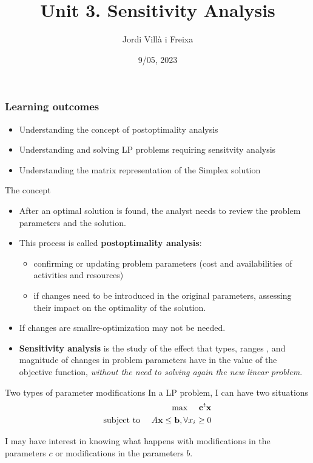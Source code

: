 \documentclass[c]{beamer}
\title[Introduction]{Unit 3. Sensitivity Analysis}
\author{Jordi Villà i Freixa}
\institute[FCTE]{
Universitat de Vic - Universitat Central de Catalunya \\
Study Abroad. Operations Research\\
\medskip
\textit{jordi.villa@uvic.cat}
}
\date{9/05, 2023}
\begin{document}
\begin{frame}
\titlepage
\end{frame}




\begin{frame}
\frametitle{Learning outcomes}
\begin{itemize}
  \item Understanding the concept of postoptimality analysis
  \item Understanding and solving LP problems requiring sensitvity analysis
  \item Understanding the matrix representation of the Simplex solution
\end{itemize}
\end{frame}

\begin{frame}{The concept}
\begin{itemize}
  \item After an optimal solution is found, the analyst needs to review the problem parameters and the solution.
  \item This process is called {\bf postoptimality analysis}:
  \begin{itemize}
    \item confirming or updating problem parameters (cost and availabilities of activities and resources)
    \item if changes need to be introduced in the original parameters, assessing their impact on the optimality of the solution.
  \end{itemize}
  \item If changes are smallre-optimization may not be needed.
  \item {\bf Sensitivity analysis} is the study of the effect that types, ranges , and magnitude of changes in problem parameters have in the value of the objective function, {\em without the need to solving again the new linear problem}.
\end{itemize}
\end{frame}

\begin{frame}{Two types of parameter modifications}
  In a LP problem, I can have two situations
\begin{eqnarray*}
 \text{max }\quad\textbf{c}^t \textbf{x}\\
 \text{subject to }\quad A\textbf{x}\leq \textbf{b}, \forall x_i\geq0
\end{eqnarray*}

I may have interest in knowing what happens with modifications in the parameters $c$ or modifications in the parameters $b$.

\end{frame}
\end{document}
